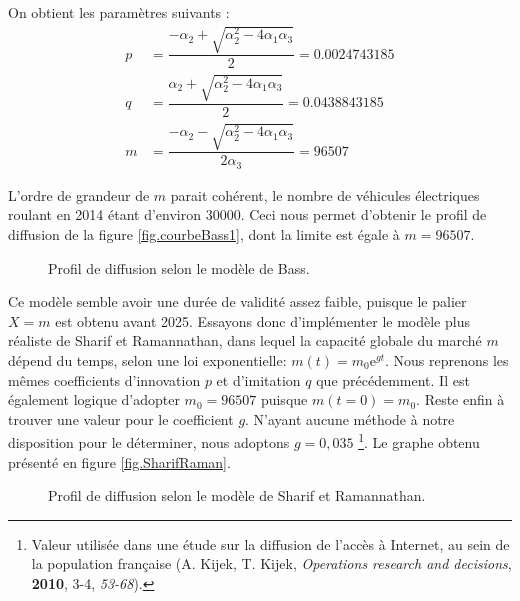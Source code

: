 		On obtient les paramètres suivants :
		\begin{align*}
			p &= \dfrac{-\alpha_2 + \sqrt{\alpha_2^2 - 4 \alpha_1 \alpha_3}}{2} = \num{0.0024743185}\\
			q &= \dfrac{\alpha_2 + \sqrt{\alpha_2^2 - 4 \alpha_1 \alpha_3}}{2} = \num{0.0438843185}\\
			m &= \dfrac{-\alpha_2 - \sqrt{\alpha_2^2 - 4 \alpha_1 \alpha_3}}{2 \alpha_3} = \num{96507}
		\end{align*}

		L'ordre de grandeur de $m$ parait cohérent, le nombre de véhicules électriques roulant en 2014 étant d'environ \num{30000}. Ceci nous permet d'obtenir le profil de diffusion de la figure \vref{fig.courbeBass1}, dont la limite est égale à $m = \num{96507}$.

		\begin{figure}[!h]
			\centering
			\caption{Profil de diffusion selon le modèle de Bass.\label{fig.courbeBass1}}
		\end{figure}

		Ce modèle semble avoir une durée de validité assez faible, puisque le palier $X = m$ est obtenu avant 2025. Essayons donc d'implémenter le modèle plus réaliste de Sharif et Ramannathan, dans lequel la capacité globale du marché $m$ dépend du temps, selon une loi exponentielle: $m(t) = m_0 \mathrm{e}^{gt}$.
		Nous reprenons les mêmes coefficients d'innovation $p$ et d'imitation $q$ que précédemment. Il est également logique d'adopter $m_0 = \num{96507}$ puisque $m(t = 0) = m_0$.
		Reste enfin à trouver une valeur pour le coefficient $g$. N'ayant aucune méthode à notre disposition pour le déterminer, nous adoptons $g = 0,035$ \footnote{Valeur utilisée dans une étude sur la diffusion de l'accès à Internet, au sein de la population française (A. Kijek, T. Kijek, \textit{Operations research and decisions}, \textbf{2010}, 3-4, \textit{53-68}).}.
		Le graphe obtenu présenté en figure \vref{fig.SharifRaman}.
		
		\begin{figure}[!h]
			\centering
			\caption{Profil de diffusion selon le modèle de Sharif et Ramannathan.\label{fig.SharifRaman}}
		\end{figure}
		
